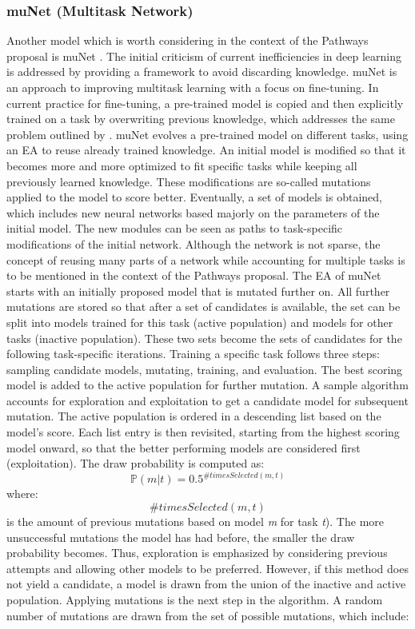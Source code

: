 \documentclass[
]{krantz}
\begin{document}
\hypertarget{munet-multitask-network}{%
\subsubsection{muNet (Multitask Network)}\label{munet-multitask-network}}

Another model which is worth considering in the context of the Pathways proposal is muNet \citep{Gesmundo2022a}. The initial criticism of current inefficiencies in deep learning is addressed by providing a framework to avoid discarding knowledge. muNet is an approach to improving multitask learning with a focus on fine-tuning. In current practice for fine-tuning, a pre-trained model is copied and then explicitly trained on a task by overwriting previous knowledge, which addresses the same problem outlined by \citet{Dean21}.
muNet evolves a pre-trained model on different tasks, using an EA to reuse already trained knowledge. An initial model is modified so that it becomes more and more optimized to fit specific tasks while keeping all previously learned knowledge. These modifications are so-called mutations applied to the model to score better. Eventually, a set of models is obtained, which includes new neural networks based majorly on the parameters of the initial model. The new modules can be seen as paths to task-specific modifications of the initial network. Although the network is not sparse, the concept of reusing many parts of a network while accounting for multiple tasks is to be mentioned in the context of the Pathways proposal.
The EA of muNet starts with an initially proposed model that is mutated further on. All further mutations are stored so that after a set of candidates is available, the set can be split into models trained for this task (active population) and models for other tasks (inactive population). These two sets become the sets of candidates for the following task-specific iterations.
Training a specific task follows three steps: sampling candidate models, mutating, training, and evaluation. The best scoring model is added to the active population for further mutation. A sample algorithm accounts for exploration and exploitation to get a candidate model for subsequent mutation. The active population is ordered in a descending list based on the model's score. Each list entry is then revisited, starting from the highest scoring model onward, so that the better performing models are considered first (exploitation). The draw probability is computed as: \[\mathbb P(m|t) = 0.5 ^{ \#timesSelected(m, t)}\]
where: \[\#timesSelected(m, t)\] is the amount of previous mutations based on model \emph{m} for task \emph{t}). The more unsuccessful mutations the model has had before, the smaller the draw probability becomes. Thus, exploration is emphasized by considering previous attempts and allowing other models to be preferred. However, if this method does not yield a candidate, a model is drawn from the union of the inactive and active population.
Applying mutations is the next step in the algorithm. A random number of mutations are drawn from the set of possible mutations, which include:
\end{document}
